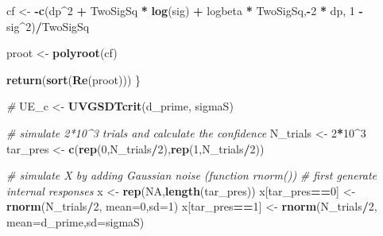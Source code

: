 \documentclass[
]{book}
\newenvironment{Shaded}{\begin{snugshade}}{\end{snugshade}}
\newcommand{\AttributeTok}[1]{\textcolor[rgb]{0.13,0.29,0.53}{#1}}
\newcommand{\CommentTok}[1]{\textcolor[rgb]{0.56,0.35,0.01}{\textit{#1}}}
\newcommand{\ConstantTok}[1]{\textcolor[rgb]{0.56,0.35,0.01}{#1}}
\newcommand{\DecValTok}[1]{\textcolor[rgb]{0.00,0.00,0.81}{#1}}
\newcommand{\FunctionTok}[1]{\textcolor[rgb]{0.13,0.29,0.53}{\textbf{#1}}}
\newcommand{\NormalTok}[1]{#1}
\newcommand{\OtherTok}[1]{\textcolor[rgb]{0.56,0.35,0.01}{#1}}
\newcommand{\SpecialCharTok}[1]{\textcolor[rgb]{0.81,0.36,0.00}{\textbf{#1}}}
\begin{document}
\begin{Shaded}
\begin{Highlighting}[]
\NormalTok{  cf }\OtherTok{\textless{}{-}} \SpecialCharTok{{-}}\FunctionTok{c}\NormalTok{(dp}\SpecialCharTok{\^{}}\DecValTok{2} \SpecialCharTok{+}\NormalTok{ TwoSigSq }\SpecialCharTok{*} \FunctionTok{log}\NormalTok{(sig) }\SpecialCharTok{+}\NormalTok{ logbeta }\SpecialCharTok{*}\NormalTok{ TwoSigSq,}\SpecialCharTok{{-}}\DecValTok{2} \SpecialCharTok{*}\NormalTok{ dp, }\DecValTok{1} \SpecialCharTok{{-}}\NormalTok{ sig}\SpecialCharTok{\^{}}\DecValTok{2}\NormalTok{)}\SpecialCharTok{/}\NormalTok{TwoSigSq}
  
\NormalTok{  proot }\OtherTok{\textless{}{-}} \FunctionTok{polyroot}\NormalTok{(cf)}
  
  \FunctionTok{return}\NormalTok{(}\FunctionTok{sort}\NormalTok{(}\FunctionTok{Re}\NormalTok{(proot)))}
\NormalTok{\}}

\CommentTok{\#}
\NormalTok{UE\_c }\OtherTok{\textless{}{-}} \FunctionTok{UVGSDTcrit}\NormalTok{(d\_prime, sigmaS)}

\CommentTok{\# simulate 2*10\^{}3 trials and calculate the confidence }
\NormalTok{N\_trials }\OtherTok{\textless{}{-}} \DecValTok{2}\SpecialCharTok{*}\DecValTok{10}\SpecialCharTok{\^{}}\DecValTok{3}
\NormalTok{tar\_pres }\OtherTok{\textless{}{-}} \FunctionTok{c}\NormalTok{(}\FunctionTok{rep}\NormalTok{(}\DecValTok{0}\NormalTok{,N\_trials}\SpecialCharTok{/}\DecValTok{2}\NormalTok{),}\FunctionTok{rep}\NormalTok{(}\DecValTok{1}\NormalTok{,N\_trials}\SpecialCharTok{/}\DecValTok{2}\NormalTok{))}

\CommentTok{\# simulate X by adding Gaussian noise (function rnorm())}
\CommentTok{\# first generate internal responses}
\NormalTok{x }\OtherTok{\textless{}{-}} \FunctionTok{rep}\NormalTok{(}\ConstantTok{NA}\NormalTok{,}\FunctionTok{length}\NormalTok{(tar\_pres))}
\NormalTok{x[tar\_pres}\SpecialCharTok{==}\DecValTok{0}\NormalTok{] }\OtherTok{\textless{}{-}} \FunctionTok{rnorm}\NormalTok{(N\_trials}\SpecialCharTok{/}\DecValTok{2}\NormalTok{, }\AttributeTok{mean=}\DecValTok{0}\NormalTok{,}\AttributeTok{sd=}\DecValTok{1}\NormalTok{)}
\NormalTok{x[tar\_pres}\SpecialCharTok{==}\DecValTok{1}\NormalTok{] }\OtherTok{\textless{}{-}} \FunctionTok{rnorm}\NormalTok{(N\_trials}\SpecialCharTok{/}\DecValTok{2}\NormalTok{, }\AttributeTok{mean=}\NormalTok{d\_prime,}\AttributeTok{sd=}\NormalTok{sigmaS)}



\end{Highlighting}
\end{Shaded}
\end{document}
